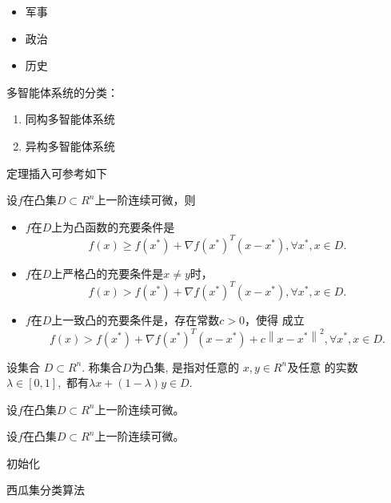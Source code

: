 

\begin{itemize}
  \item 军事
  \item 政治
  \item 历史
\end{itemize}


多智能体系统的分类：
\begin{enumerate}[label=\alph*)]   
  \item 同构多智能体系统
  \item 异构多智能体系统
\end{enumerate}


定理插入可参考如下
\begin{theorem}
设$f$在凸集$D \subset {R^n}$上一阶连续可微，则
\begin{itemize}
\item $f$在$D$上为凸函数的充要条件是
\begin{equation*}
f(x) \ge f({x^*}) + \nabla f{({x^*})^T}(x - {x^*}),\forall {x^*},x \in D.
\end{equation*}
\item  $f$在$D$上严格凸的充要条件是$x \ne y$时，
\begin{equation*}
f(x) > f({x^*}) + \nabla f{({x^*})^T}(x - {x^*}),\forall {x^*},x \in D.
\end{equation*}
\item $f$在$D$上一致凸的充要条件是，存在常数$c > 0$，使得
成立
\begin{equation*}
f(x) > f({x^*}) + \nabla f{({x^*})^T}(x - {x^*}) + c{\left\| {x - {x^*}} \right\|^2},\forall {x^*},x \in D.
\end{equation*}
\end{itemize}
\end{theorem}


\begin{definition}
设集合 $D \subset {R^n}.$ 称集合$D$为凸集, 是指对任意的 $x,y \in {R^n}$及任意
的实数$\lambda  \in [0,1],$ 都有$\lambda x + (1 - \lambda )y \in D.$
\end{definition}


\begin{assumption}
设$f$在凸集$D \subset {R^n}$上一阶连续可微。
\end{assumption}


\begin{problem}
  设$f$在凸集$D \subset {R^n}$上一阶连续可微。
  \end{problem}
 


\begin{algorithm}[H]
    初始化\;
    \caption{西瓜集分类算法}
\end{algorithm}
